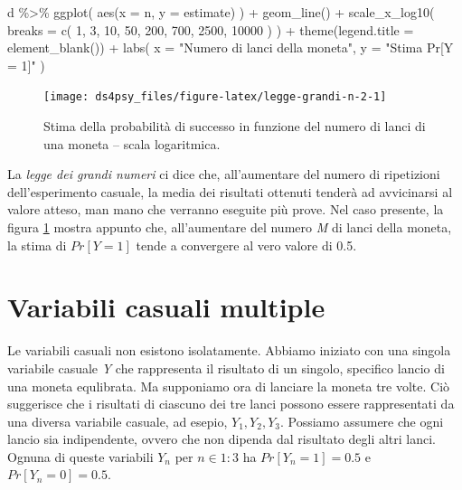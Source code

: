 \documentclass[
  11pt,
]{krantz}
\makeatletter
\newenvironment{Shaded}{\begin{snugshade}}{\end{snugshade}}
\newcommand{\AttributeTok}[1]{\textcolor[rgb]{0.61,0.61,0.61}{#1}}
\newcommand{\DecValTok}[1]{\textcolor[rgb]{0.06,0.06,0.06}{#1}}
\newcommand{\FunctionTok}[1]{\textcolor[rgb]{0,0,0}{#1}}
\newcommand{\NormalTok}[1]{#1}
\newcommand{\SpecialCharTok}[1]{\textcolor[rgb]{0,0,0}{#1}}
\newcommand{\StringTok}[1]{\textcolor[rgb]{0.5,0.5,0.5}{#1}}
\newenvironment{kframe}{%
\medskip{}
\setlength{\fboxsep}{.8em}
 \def\at@end@of@kframe{}%
 \ifinner\ifhmode%
  \def\at@end@of@kframe{\end{minipage}}%
  \begin{minipage}{\columnwidth}%
 \fi\fi%
 \def\FrameCommand##1{\hskip\@totalleftmargin \hskip-\fboxsep
 \colorbox{shadecolor}{##1}\hskip-\fboxsep
     \hskip-\linewidth \hskip-\@totalleftmargin \hskip\columnwidth}%
 \MakeFramed {\advance\hsize-\width
   \@totalleftmargin\z@ \linewidth\hsize
   \@setminipage}}%
 {\par\unskip\endMakeFramed%
 \at@end@of@kframe}
\renewenvironment{Shaded}{\begin{kframe}}{\end{kframe}}
\theoremstyle{definition}
\theoremstyle{definition}
\theoremstyle{definition}
\theoremstyle{definition}
\theoremstyle{remark}
\makeatother
\begin{document}
\begin{Shaded}
\begin{Highlighting}[]
\NormalTok{d }\SpecialCharTok{\%\textgreater{}\%}
  \FunctionTok{ggplot}\NormalTok{(}
    \FunctionTok{aes}\NormalTok{(}\AttributeTok{x =}\NormalTok{ n, }\AttributeTok{y =}\NormalTok{ estimate)}
\NormalTok{  ) }\SpecialCharTok{+}
  \FunctionTok{geom\_line}\NormalTok{() }\SpecialCharTok{+}
  \FunctionTok{scale\_x\_log10}\NormalTok{(}
    \AttributeTok{breaks =} \FunctionTok{c}\NormalTok{(}
      \DecValTok{1}\NormalTok{, }\DecValTok{3}\NormalTok{, }\DecValTok{10}\NormalTok{, }\DecValTok{50}\NormalTok{, }\DecValTok{200}\NormalTok{,}
      \DecValTok{700}\NormalTok{, }\DecValTok{2500}\NormalTok{, }\DecValTok{10000}
\NormalTok{    )}
\NormalTok{  ) }\SpecialCharTok{+}
  \FunctionTok{theme}\NormalTok{(}\AttributeTok{legend.title =} \FunctionTok{element\_blank}\NormalTok{()) }\SpecialCharTok{+}
  \FunctionTok{labs}\NormalTok{(}
    \AttributeTok{x =} \StringTok{"Numero di lanci della moneta"}\NormalTok{,}
    \AttributeTok{y =} \StringTok{"Stima Pr[Y = 1]"}
\NormalTok{  )}
\end{Highlighting}
\end{Shaded}

\begin{figure}[h]

{\centering \texttt{[image: ds4psy\_files/figure-latex/legge-grandi-n-2-1]} 

}

\caption{Stima della probabilità di successo in funzione del numero di lanci di una moneta -- scala logaritmica.}\label{fig:legge-grandi-n-2}
\end{figure}

La \emph{legge dei grandi numeri} ci dice che, all'aumentare del numero di ripetizioni dell'esperimento casuale, la media dei risultati ottenuti tenderà ad avvicinarsi al valore atteso, man mano che verranno eseguite più prove. Nel caso presente, la figura \ref{fig:legge-grandi-n-2} mostra appunto che, all'aumentare del numero \emph{M} di lanci della moneta, la stima di \(Pr[Y = 1]\) tende a convergere al vero valore di 0.5.

\hypertarget{variabili-casuali-multiple}{%
\section{Variabili casuali multiple}\label{variabili-casuali-multiple}}

Le variabili casuali non esistono isolatamente. Abbiamo iniziato con una singola variabile casuale \emph{Y} che rappresenta il risultato di un singolo, specifico lancio di una moneta equlibrata. Ma supponiamo ora di lanciare la moneta tre volte. Ciò suggerisce che i risultati di ciascuno dei tre lanci possono essere rappresentati da una diversa variabile casuale, ad esepio, \(Y_1 , Y_2 , Y_3\). Possiamo assumere che ogni lancio sia indipendente, ovvero che non dipenda dal risultato degli altri lanci. Ognuna di queste variabili \(Y_n\) per \(n \in 1:3\) ha \(Pr[Y_n =1]=0.5\) e \(Pr[Y_n =0]=0.5\).
\end{document}
